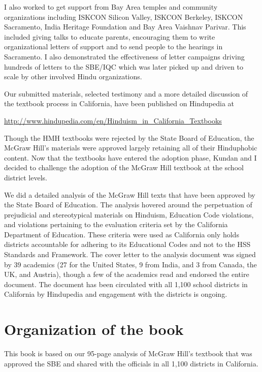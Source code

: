 I also worked to get support from Bay Area temples and community organizations including ISKCON Silicon Valley, ISKCON Berkeley, ISKCON Sacramento, India Heritage Foundation and Bay Area Vaishnav Parivar. This included giving talks to educate parents, encouraging them to write organizational letters of support and to send people to the hearings in Sacramento. I also demonstrated the effectiveness of letter campaigns driving hundreds of letters to the SBE/IQC which was later picked up and driven to scale by other involved Hindu organizations.

Our submitted materials, selected testimony and a more detailed discussion of the textbook process in California, have been published on Hindupedia at 

{\small\url{http://www.hindupedia.com/en/Hinduism_in_California_Textbooks}}

Though the HMH textbooks were rejected by the State Board of Education, the McGraw Hill’s materials were approved largely retaining all of their Hinduphobic content. Now that the textbooks have entered the adoption phase, Kundan and I decided to challenge the adoption of the McGraw Hill textbook at the school district levels. 

We did a detailed analysis of the McGraw Hill texts that have been approved by the State Board of Education. The analysis hovered around the perpetuation of prejudicial and stereotypical materials on Hinduism, Education Code violations, and violations pertaining to the evaluation criteria set by the California Department of Education. These criteria were used as California only holds districts accountable for adhering to its Educational Codes and not to the HSS Standards and Framework. The cover letter to the analysis document was signed by 39 academics (27 for the United States, 9 from India, and 3 from Canada, the UK, and Austria), though a few of the academics read and endorsed the entire document. The document has been circulated with all 1,100 school districts in California by Hindupedia and engagement with the districts is ongoing.

\section*{Organization of the book}
\vskip -5pt

This book is based on our 95-page analysis of McGraw Hill’s textbook that was approved the SBE and shared with the officials in all 1,100 districts in California. 

